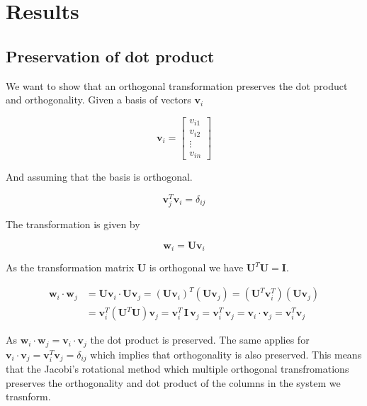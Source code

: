 \documentclass[a4paper, fontsize=11pt]{article}
\begin{document}
\section{Results}
\subsection{Preservation of dot product}
We want to show that an orthogonal transformation preserves the dot product and orthogonality. Given a basis of vectors $\textbf{v}_{i}$

\begin{equation}
\textbf{v}_{i}=
\begin{bmatrix}
v_{i1} \\
v_{i2} \\
\vdots \\
v_{in}
\end{bmatrix}
\end{equation}

And assuming that the basis is orthogonal.

\begin{equation}
\textbf{v}^{T}_{j} \textbf{v}_{i} = \delta_{ij}
\end{equation}

The transformation is given by

\begin{equation}
\textbf{w}_{i} = \textbf{U} \textbf{v}_{i}
\end{equation}

As the transformation matrix \textbf{U} is orthogonal we have $\textbf{U}^{T}\textbf{U} = \textbf{I}$.

\begin{align*}
\textbf{w}_{i} \cdot \textbf{w}_{j} & =\textbf{U} \textbf{v}_{i} \cdot \textbf{U} \textbf{v}_{j} = (\textbf{U}\textbf{v}_{i})^{T}(\textbf{U}\textbf{v}_{j})=(\textbf{U}^{T} \textbf{v}_{i}^{T})(\textbf{U}\textbf{v}_{j})\\
&= \textbf{v}_{i}^{T} (\textbf{U}^{T} \textbf{U}) \textbf{v}_{j}= \textbf{v}_{i}^{T} \, \textbf{I} \, \textbf{v}_{j} =  \textbf{v}_{i}^{T} \,  \textbf{v}_{j} = \textbf{v}_{i} \cdot \textbf{v}_{j} = \textbf{v}^T_{i} \textbf{v}_{j}
\end{align*}

As $\textbf{w}_{i} \cdot \textbf{w}_{j} = \textbf{v}_{i} \cdot \textbf{v}_{j}$ the dot product is preserved. The same applies for $\textbf{v}_{i} \cdot \textbf{v}_{j} = \textbf{v}^T_{i} \textbf{v}_{j} = \delta_{ij}$ which implies that orthogonality is also preserved. This means that the Jacobi's rotational method which multiple orthogonal transfromations preserves the orthogonality and dot product of the columns in the system we trasnform.
\end{document}
